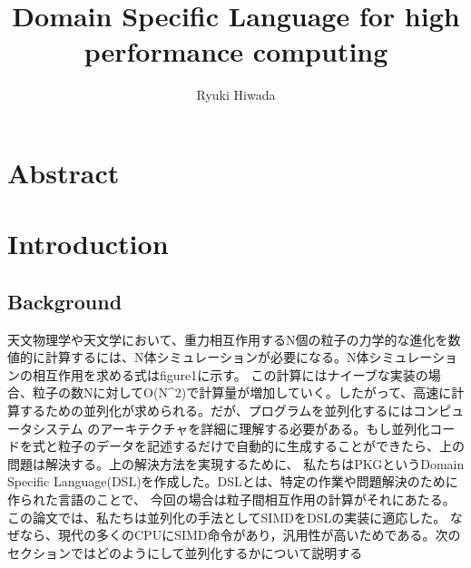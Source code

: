 \documentclass[twocolumn, a4j]{article}
\author{Ryuki Hiwada}
\title{Domain Specific Language for high performance computing}
\begin{document}
\maketitle
\section{Abstract}
\section{Introduction}
\subsection{Background}

天文物理学や天文学において、重力相互作用するN個の粒子の力学的な進化を数値的に計算するには、N体シミュレーションが必要になる。N体シミュレーションの相互作用を求める式はfigure1に示す。
この計算にはナイーブな実装の場合、粒子の数Nに対してO(N^2)で計算量が増加していく。したがって、高速に計算するための並列化が求められる。だが、プログラムを並列化するにはコンピュータシステム
のアーキテクチャを詳細に理解する必要がある。もし並列化コードを式と粒子のデータを記述するだけで自動的に生成することができたら、上の問題は解決する。上の解決方法を実現するために、
私たちはPKGというDomain Specific Language(DSL)を作成した。DSLとは、特定の作業や問題解決のために作られた言語のことで、
今回の場合は粒子間相互作用の計算がそれにあたる。この論文では、私たちは並列化の手法としてSIMDをDSLの実装に適応した。
なぜなら、現代の多くのCPUにSIMD命令があり，汎用性が高いためである。次のセクションではどのようにして並列化するかについて説明する
\end{document}
